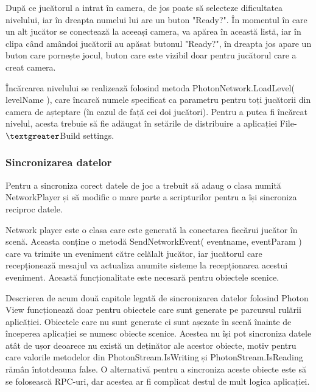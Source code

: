 \documentclass[12pt, a4paper]{article}
\begin{document}
	După ce jucătorul a intrat în camera, de jos poate să selecteze dificultatea nivelului, iar în dreapta numelui lui are un buton "Ready?". În momentul în care un alt jucător se conectează la aceeași camera, va apărea în această listă, iar în clipa când amândoi jucătorii au apăsat butonul "Ready?", în dreapta jos apare un buton care pornește jocul, buton care este vizibil doar pentru jucătorul care a creat camera.
	\newline
	
	Încărcarea nivelului se realizează folosind metoda PhotonNetwork.LoadLevel( levelName ), care încarcă numele specificat ca parametru pentru toți jucătorii din camera de așteptare (în cazul de față cei doi jucători). Pentru a putea fi încărcat nivelul, acesta trebuie să fie adăugat în setările de distribuire a aplicației File-$\textgreater$Build settings.
	
	
	
	
	
	\subsubsection{Sincronizarea datelor}
	\label{section: dataSync}
	
	Pentru a sincroniza corect datele de joc a trebuit să adaug o clasa numită NetworkPlayer și să modific o mare parte a scripturilor pentru a își sincroniza reciproc datele.
	\newline
	
	Network player este o clasa care este generată la conectarea fiecărui jucător în scenă. Aceasta conține o metodă SendNetworkEvent( eventname, eventParam ) care va trimite un eveniment către celălalt jucător, iar jucătorul care recepționează mesajul va actualiza anumite sisteme la recepționarea acestui eveniment. Această funcționalitate este necesară pentru obiectele scenice.
	\newline
	
	Descrierea de acum două capitole legată de sincronizarea datelor folosind Photon View funcționează doar pentru obiectele care sunt generate pe parcursul rulării aplicăției. Obiectele care nu sunt generate ci sunt așezate în scenă înainte de începerea aplicației se numesc obiecte scenice. Acestea nu își pot sincroniza datele atât de ușor deoarece nu există un deținător ale acestor obiecte, motiv pentru care valorile metodelor din PhotonStream.IsWriting și PhotonStream.IsReading rămân întotdeauna false. O alternativă pentru a sincroniza aceste obiecte este să se folosească RPC-uri, dar acestea ar fi complicat destul de mult logica aplicației.
	\newline
	
\end{document}
